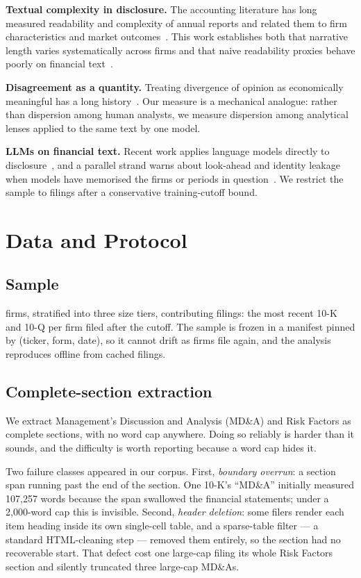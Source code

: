 \documentclass[sigconf,nonacm]{acmart}
\begin{document}
\textbf{Textual complexity in disclosure.} The accounting literature has long
measured readability and complexity of annual reports and related them to firm
characteristics and market outcomes~\cite{li2008, lm2011, lm2014, bgt2018}. This
work establishes both that narrative length varies systematically across firms
and that naive readability proxies behave poorly on financial
text~\cite{lm2014}.

\textbf{Disagreement as a quantity.} Treating divergence of opinion as
economically meaningful has a long history~\cite{miller1977, dms2002}. Our
measure is a mechanical analogue: rather than dispersion among human analysts, we
measure dispersion among analytical lenses applied to the same text by one model.

\textbf{LLMs on financial text.} Recent work applies language models directly to
disclosure~\cite{kmn2023, ll2023}, and a parallel strand warns about look-ahead
and identity leakage when models have memorised the firms or periods in
question~\cite{glasserman2023}. We restrict the sample to filings after a
conservative training-cutoff bound. 

\section{Data and Protocol}

\subsection{Sample}

\NFirms{} firms, stratified into three size tiers, contributing \NFilings{}
filings: the most recent 10-K and 10-Q per firm filed after the cutoff. The
sample is frozen in a manifest pinned by (ticker, form, date), so it cannot drift
as firms file again, and the analysis reproduces offline from cached filings.

\subsection{Complete-section extraction}

We extract Management's Discussion and Analysis (MD\&A) and Risk Factors as
complete sections, with no word cap anywhere. Doing so reliably is harder than it
sounds, and the difficulty is worth reporting because a word cap hides it.

Two failure classes appeared in our corpus. First, \emph{boundary overrun}: a
section span running past the end of the section. One 10-K's ``MD\&A'' initially
measured 107{,}257 words because the span swallowed the financial statements;
under a 2{,}000-word cap this is invisible. Second, \emph{header deletion}: some
filers render each item heading inside its own single-cell table, and a
sparse-table filter --- a standard HTML-cleaning step --- removed them entirely,
so the section had no recoverable start. That defect cost one large-cap filing its
whole Risk Factors section and silently truncated three large-cap MD\&As.
\end{document}
